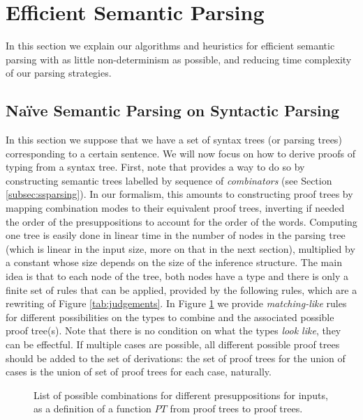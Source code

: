 \section{Efficient Semantic Parsing}
\label{sec:parsing}
In this section we explain our algorithms and heuristics for efficient semantic
parsing with as little non-determinism as possible, and reducing time complexity
of our parsing strategies.

\subsection{Naïve Semantic Parsing on Syntactic Parsing}
In this section we suppose that we have a set of syntax trees
(or parsing trees) corresponding to a certain sentence.
We will now focus on how to derive proofs of typing from a syntax tree.
First, note that \cite{bumfordEffectdrivenInterpretationFunctors2025} provides
a way to do so by constructing semantic trees labelled by sequence of
\emph{combinators} (see Section \ref{subsec:ssparsing}).
In our formalism, this amounts to constructing proof trees by mapping
combination modes to their equivalent proof trees, inverting if needed the
order of the presuppositions to account for the order of the words.
Computing one tree is easily done in linear time in the number of nodes in the
parsing tree (which is linear in the input size, more on that in the next
section), multiplied by a constant whose size depends on the size of the
inference structure.
The main idea is that to each node of the tree, both nodes have a type and
there is only a finite set of rules that can be applied, provided by the
following rules, which are a rewriting of Figure \ref{tab:judgements}.
In Figure \ref{tab:proof-trees} we provide \emph{matching-like} rules for
different possibilities on the types to combine and the associated possible
proof tree(s).
Note that there is no condition on what the types \emph{look like}, they can
be effectful.
If multiple cases are possible, all different possible proof trees should be
added to the set of derivations: the set of proof trees for the union of cases
is the union of set of proof trees for each case, naturally.

\begin{figure}
	\centering
	\caption{List of possible combinations for different presuppositions for inputs, as a definition of a function
		$PT$ from proof trees to proof trees.}
	\label{tab:proof-trees}
\end{figure}

